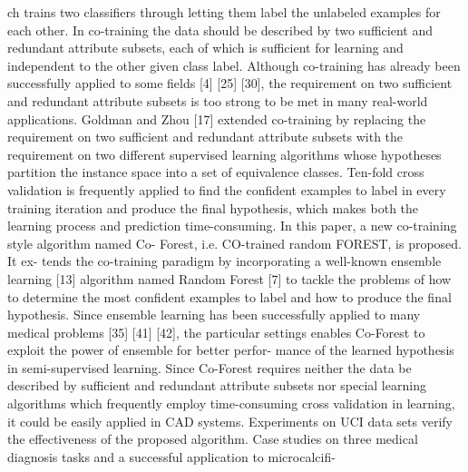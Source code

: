 \documentclass[journal]{IEEEtran}
\begin{document}
ch trains two classifiers through letting them label the unlabeled examples for each other. In co-training the data should be described by two sufficient and redundant attribute subsets, each of which is sufficient for learning and independent to the other given class label.
Although co-training has already been successfully applied to some fields [4] [25] [30], the requirement on two sufficient and redundant attribute subsets is too strong to be met in many real-world applications. Goldman and Zhou [17] extended co-training by replacing the requirement on two sufficient and redundant attribute subsets with the requirement on two different supervised learning algorithms whose hypotheses partition the instance space into a set of equivalence classes. Ten-fold cross validation is frequently applied to find the confident examples to label in every training iteration and produce the final hypothesis, which makes both the learning process and prediction time-consuming.
In this paper, a new co-training style algorithm named Co- Forest, i.e. CO-trained random FOREST, is proposed. It ex- tends the co-training paradigm by incorporating a well-known ensemble learning [13] algorithm named Random Forest [7] to tackle the problems of how to determine the most confident examples to label and how to produce the final hypothesis. Since ensemble learning has been successfully applied to many medical problems [35] [41] [42], the particular settings enables Co-Forest to exploit the power of ensemble for better perfor- mance of the learned hypothesis in semi-supervised learning. Since Co-Forest requires neither the data be described by sufficient and redundant attribute subsets nor special learning algorithms which frequently employ time-consuming cross validation in learning, it could be easily applied in CAD systems. Experiments on UCI data sets verify the effectiveness of the proposed algorithm. Case studies on three medical diagnosis tasks and a successful application to microcalcifi-

%
%
\end{document}
